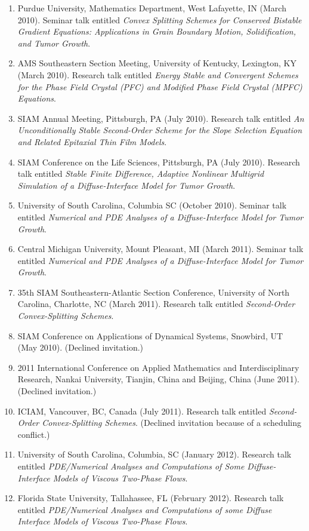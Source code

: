 \documentclass[10pt,letterpaper]{article}
\begin{document}
\begin{enumerate}
    \item
Purdue University, Mathematics Department, West Lafayette, IN (March 2010).  Seminar talk entitled {\sl Convex Splitting Schemes for Conserved Bistable Gradient Equations: Applications in Grain Boundary Motion, Solidification, and Tumor Growth}.
	\item
AMS Southeastern Section Meeting, University of Kentucky, Lexington, KY (March 2010). Research talk entitled {\sl Energy Stable and Convergent Schemes for the Phase Field Crystal (PFC) and Modified Phase Field Crystal (MPFC) Equations}.
	\item
SIAM Annual Meeting, Pittsburgh, PA (July 2010). Research talk entitled {\sl An Unconditionally Stable Second-Order Scheme for the Slope Selection Equation and Related Epitaxial Thin Film Models}.
	\item
SIAM Conference on the Life Sciences, Pittsburgh, PA (July 2010). Research talk entitled {\sl Stable Finite Difference, Adaptive Nonlinear Multigrid Simulation of a Diffuse-Interface Model for Tumor Growth}.
	\item
University of South Carolina, Columbia SC (October 2010). Seminar talk entitled {\sl Numerical and PDE Analyses of a Diffuse-Interface Model for Tumor Growth}.
	\item
Central Michigan University, Mount Pleasant, MI (March 2011). Seminar talk entitled {\sl Numerical and PDE Analyses of a Diffuse-Interface Model for Tumor Growth}.
	\item
35th SIAM Southeastern-Atlantic Section Conference, University of North Carolina, Charlotte, NC (March 2011).  Research talk entitled {\sl Second-Order Convex-Splitting Schemes}.
	\item
SIAM Conference on Applications of Dynamical Systems, Snowbird, UT (May 2010). (Declined invitation.)
	\item
2011 International Conference on Applied Mathematics and Interdisciplinary Research, Nankai University, Tianjin, China and Beijing, China (June 2011). (Declined invitation.)
	\item
ICIAM, Vancouver, BC, Canada (July 2011). Research talk entitled {\sl Second-Order Convex-Splitting Schemes}. (Declined invitation because of a scheduling conflict.)
	\item
University of South Carolina, Columbia, SC (January 2012). Research talk entitled {\sl PDE/Numerical Analyses and Computations of Some Diffuse-Interface Models of Viscous Two-Phase Flows}.
	\item
Florida State University, Tallahassee, FL (February 2012). Research talk entitled {\sl PDE/Numerical Analyses and Computations of some Diffuse Interface Models of Viscous Two-Phase Flows}.

\end{enumerate}
\end{document}

